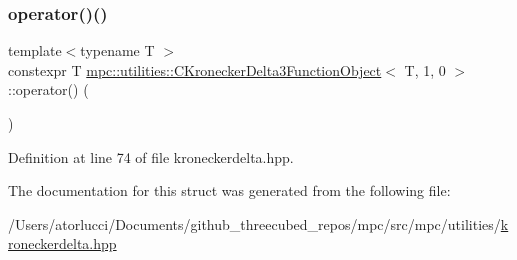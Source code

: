 \subsubsection{\texorpdfstring{operator()()}{operator()()}}
{\footnotesize\ttfamily template$<$typename T $>$ \\
constexpr T \mbox{\hyperlink{structmpc_1_1utilities_1_1_c_kronecker_delta3_function_object}{mpc\+::utilities\+::\+C\+Kronecker\+Delta3\+Function\+Object}}$<$ T, 1, 0 $>$\+::operator() (\begin{DoxyParamCaption}{ }\end{DoxyParamCaption})\hspace{0.3cm}{\ttfamily [inline]}}



Definition at line 74 of file kroneckerdelta.\+hpp.



The documentation for this struct was generated from the following file\+:\begin{DoxyCompactItemize}
\item 
/\+Users/atorlucci/\+Documents/github\+\_\+threecubed\+\_\+repos/mpc/src/mpc/utilities/\mbox{\hyperlink{kroneckerdelta_8hpp}{kroneckerdelta.\+hpp}}\end{DoxyCompactItemize}
